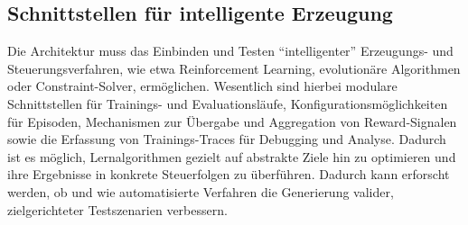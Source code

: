 \subsection{Schnittstellen für intelligente Erzeugung}

Die Architektur muss das Einbinden und Testen \enquote{intelligenter} Erzeugungs- und Steuerungsverfahren, wie etwa Reinforcement Learning, evolutionäre Algorithmen oder Constraint-Solver, ermöglichen. Wesentlich sind hierbei modulare Schnittstellen für Trainings- und Evaluationsläufe, Konfigurationsmöglichkeiten für Episoden, Mechanismen zur Übergabe und Aggregation von Reward-Signalen sowie die Erfassung von Trainings-Traces für Debugging und Analyse. Dadurch ist es möglich, Lernalgorithmen gezielt auf abstrakte Ziele hin zu optimieren und ihre Ergebnisse in konkrete Steuerfolgen zu überführen. Dadurch kann erforscht werden, ob und wie automatisierte Verfahren die Generierung valider, zielgerichteter Testszenarien verbessern.
